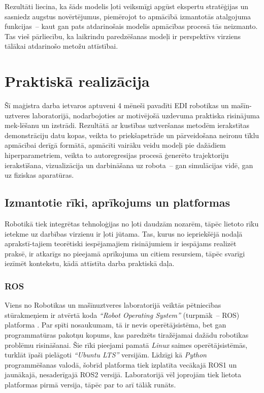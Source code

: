 \documentclass[12pt, a4paper]{article}
\numberwithin{equation}{section} %
\begin{document}
Rezultāti liecina, ka šāds modelis ļoti veiksmīgi apgūst ekspertu stratēģijas un sasniedz augstus novērtējumus, piemērojot to apmācībā izmantotās atalgojuma funkcijas~-- kaut gan pats atdarinošais modelis apmācības procesā tās neizmanto. Tas vieš pārliecību, ka laikrindu paredzēšanas modeļi ir perspektīvs virziens tālākai atdarinošo metožu attīstībai.



%
%
%
%
%
%
%
%
%
%
%
%
%
%
%
%
%
%
%

\newpage
\section{Praktiskā realizācija}

Šī maģistra darba ietvaros aptuveni 4 mēneši pavadīti EDI robotikas un mašīn-uztveres laboratorijā, nodarbojoties ar motivējošā uzdevuma praktiska risinājuma mek-lēšanu un izstrādi. Rezultātā ar kustības uztveršanas metodēm ierakstītas demonstrāciju datu kopas, veikta to priekšapstrāde un pārveidošana neironu tīklu apmācībai derīgā formātā, apmācīti vairāku veidu modeļi pie dažādiem hiperparametriem, veikta to autoregresijas procesā ģenerēto trajektoriju ierakstīšana, vizualizācija un darbināšana uz robota~-- gan simulācijas vidē, gan uz fiziskas aparatūras.


\subsection{Izmantotie rīki, aprīkojums un platformas}

Robotikā tiek integrētas tehnoloģijas no ļoti daudzām nozarēm, tāpēc lietoto rīku ietekme uz darbības virzienu ir ļoti jūtama. Tas, kurus no iepriekšējā nodaļā aprakstī-tajiem teorētiski iespējamajiem risinājumiem ir iespājams realizēt praksē, ir atkarīgs no pieejamā aprīkojuma un citiem resursiem, tāpēc svarīgi iezīmēt kontekstu, kādā attīstīta darba praktiskā daļa.

\subsubsection{ROS}

Viens no Robotikas un mašīnuztveres laboratorijā veiktās pētniecības stūrakmeņiem ir atvērtā koda \textit{``Robot Operating System''} (turpmāk~-- ROS) platforma \cite{ros_org}. Par spīti nosaukumam, tā ir nevis operētājsistēma, bet gan programmatūras pakotņu kopums, kas paredzēts tiražējamai dažādu robotikas problēmu risināšanai. Šie rīki pieejami pamatā \textit{Linux} saimes operētājsistēmās, turklāt īpaši pielāgoti \textit{``Ubuntu LTS''} versijām. Līdzīgi kā \textit{Python} programmēšanas valodā, šobrīd platforma tiek izplatīta vecākajā ROS1 un jaunākajā, nesaderīgajā ROS2 versijā. Laboratorijā vēl joprojām tiek lietota platformas pirmā versija, tāpēc par to arī tālāk runāts.
\end{document}
